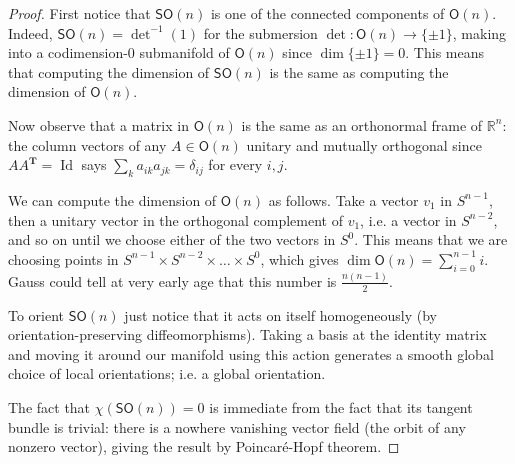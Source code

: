 \begin{proof}\leavevmode
	First notice that \(\mathsf{SO}(n)\) is one of the connected components of \(\mathsf{O}(n)\). Indeed, \(\mathsf{SO}(n)=\det^{-1}(1)\) for the submersion \(\det:\mathsf{O}(n)\to \{\pm 1\}\), making into a codimension-0 submanifold of  \(\mathsf{O}(n)\) since \(\dim \{\pm 1\}=0\). This means that computing the dimension of \(\mathsf{SO}(n)\) is the same as computing the dimension of \(\mathsf{O}(n)\).

	Now observe that a matrix in \(\mathsf{O}(n)\) is the same as an orthonormal frame of \(\mathbb{R}^n\): the column vectors of any  \(A \in \mathsf{O}(n)\) unitary and mutually orthogonal since \(A A ^{\mathbf{T}}=\operatorname{Id}\) says \(\sum_{k}a_{ik}a_{jk}=\delta_{ij}\) for every \(i,j\). 

	We can compute the dimension of \(\mathsf{O}(n)\) as follows. Take a vector \(v_1\) in \(S^{n-1}\), then a unitary vector in the orthogonal complement of  \(v_1\), i.e. a vector in \(S^{n-2}\), and so on until we choose either of the two vectors in \(S^0\). This means that we are choosing points in \(S^{n-1}\times S^{n-2} \times \ldots \times S^0\), which gives \(\dim \mathsf{O}(n)=\sum_{i=0}^{n-1}i\). Gauss could tell at very early age that this number is \(\frac{n(n-1)}{2}\).

	To orient \(\mathsf{SO}(n)\) just notice that it acts on itself homogeneously (by orientation-preserving diffeomorphisms). Taking a basis at the identity matrix and moving it around our manifold using this action generates a smooth global choice of local orientations; i.e. a global orientation.

	The fact that \(\chi(\mathsf{SO}(n))=0\) is immediate from the fact that its tangent bundle is trivial: there is a nowhere vanishing vector field (the orbit of any nonzero vector), giving the result by Poincaré-Hopf theorem.

\end{proof}

